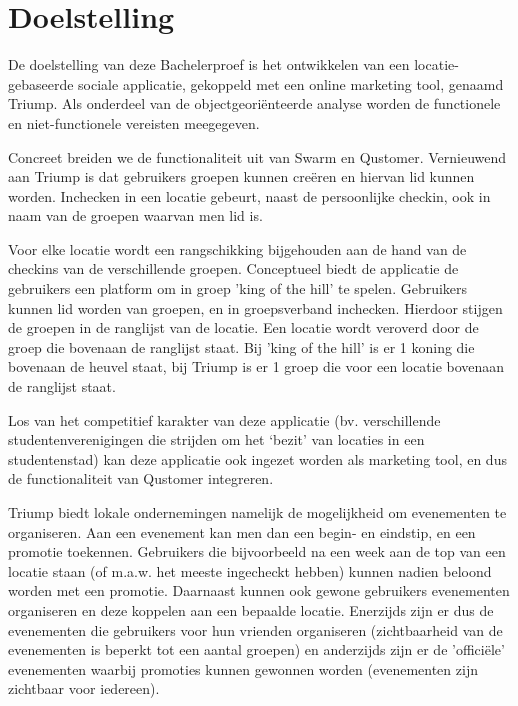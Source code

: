 
\chapter{Doelstelling}

De doelstelling van deze Bachelerproef is het ontwikkelen van een locatie-gebaseerde sociale applicatie, gekoppeld met een online marketing tool, genaamd Triump. Als onderdeel van de objectgeoriënteerde analyse worden de functionele en niet-functionele vereisten meegegeven.

Concreet breiden we de functionaliteit uit van Swarm en Qustomer. Vernieuwend aan Triump is dat gebruikers groepen kunnen creëren en hiervan lid kunnen worden. Inchecken in een locatie gebeurt, naast de persoonlijke checkin, ook in naam van de groepen waarvan men lid is. 

Voor elke locatie wordt een rangschikking bijgehouden aan de hand van de checkins van de verschillende groepen. Conceptueel biedt de applicatie de gebruikers een platform om in groep 'king of the hill' te spelen. Gebruikers kunnen lid worden van groepen, en in groepsverband inchecken. Hierdoor stijgen de groepen in de ranglijst van de locatie. Een locatie wordt veroverd door de groep die bovenaan de ranglijst staat.
Bij 'king of the hill' is er 1 koning die bovenaan de heuvel staat, bij Triump is er 1 groep die voor een locatie bovenaan de ranglijst staat.

Los van het competitief karakter van deze applicatie (bv. verschillende studentenverenigingen die strijden om het ‘bezit’ van locaties in een studentenstad) kan deze applicatie ook ingezet worden als marketing tool, en dus de functionaliteit van Qustomer integreren.

Triump biedt lokale ondernemingen namelijk de mogelijkheid om evenementen te organiseren. Aan een evenement kan men dan een begin- en eindstip, en een promotie toekennen. Gebruikers die bijvoorbeeld na een week aan de top van een locatie staan (of m.a.w. het meeste ingecheckt hebben) kunnen nadien beloond worden met een promotie. Daarnaast kunnen ook gewone gebruikers evenementen organiseren en deze koppelen aan een bepaalde locatie.
Enerzijds zijn er dus de evenementen die gebruikers voor hun vrienden organiseren (zichtbaarheid van de evenementen is beperkt tot een aantal groepen) en anderzijds zijn er de 'officiële' evenementen waarbij promoties kunnen gewonnen worden (evenementen zijn zichtbaar voor iedereen). 


